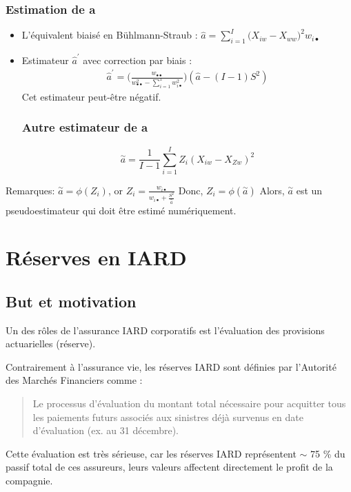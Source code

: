 \documentclass[11pt,french]{report}
\begin{document}
\subsection{Estimation de a}
\begin{itemize}
\item L'équivalent biaisé en Bühlmann-Straub : $\widehat{a} = \sum_{i=1}^{I} \Big(X_{iw} - X_{ww} \Big)^2 w_{i \bullet} $
\item Estimateur $\widehat{a}^{'}$ avec correction par biais : 
\begin{align*}
\widehat{a}^{'} = \Big( \frac{w_{\bullet \bullet}}{w_{\bullet \bullet}^2 - \sum_{i=1}^{x} w_{i \bullet}^2}\Big) (\widehat{a} - (I -1)S^2) 
\end{align*}
Cet estimateur peut-être négatif.\\
\subsection{Autre estimateur de a}
\begin{equation}
\overset{\sim}{a} = \frac{1}{I - 1} \sum_{i = 1}^{I} Z_i (X_{iw}-X_{Zw})^2
\end{equation}
\end{itemize}
Remarques:
$\overset{\sim}{a} = \phi(Z_i)$, or $Z_i = \frac{w_{i\bullet}}{w_{i\bullet} + \frac{S^2}{\overset{\sim}{a}}}$
Donc,
$Z_i = \phi(\overset{\sim}{a})$
Alors, $\overset{\sim}{a}$ est un pseudoestimateur qui doit être estimé numériquement.


\chapter{Réserves en IARD}
\section{But et motivation}
Un des rôles de l'assurance IARD corporatifs est l'évaluation des provisions actuarielles (réserve).

Contrairement à l'assurance vie, les réserves IARD sont définies par l'Autorité des Marchés Financiers comme :
\begin{quotation}
Le processus d'évaluation du montant total nécessaire pour acquitter tous les paiements futurs associés aux sinistres déjà survenus en date d'évaluation (ex. au 31 décembre).
\end{quotation}

Cette évaluation est très sérieuse, car les réserves IARD représentent $\sim$ 75 \% du passif total de ces assureurs, leurs valeurs affectent directement le profit de la compagnie.
\end{document}

